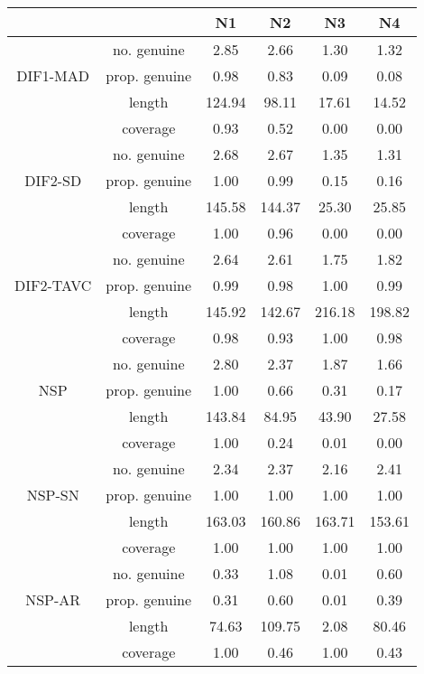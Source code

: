 \begin{tabular}{|c|c|c|c|c|c|}
  \hline
 &  & N1 & N2 & N3 & N4 \\ 
  \hline
 & no. genuine & 2.85 & 2.66 & 1.30 & 1.32 \\ 
  DIF1-MAD & prop. genuine & 0.98 & 0.83 & 0.09 & 0.08 \\ 
   & length & 124.94 & 98.11 & 17.61 & 14.52 \\ 
   & coverage & 0.93 & 0.52 & 0.00 & 0.00 \\ 
   & no. genuine & 2.68 & 2.67 & 1.35 & 1.31 \\ 
  DIF2-SD & prop. genuine & 1.00 & 0.99 & 0.15 & 0.16 \\ 
   & length & 145.58 & 144.37 & 25.30 & 25.85 \\ 
   & coverage & 1.00 & 0.96 & 0.00 & 0.00 \\ 
   & no. genuine & 2.64 & 2.61 & 1.75 & 1.82 \\ 
  DIF2-TAVC & prop. genuine & 0.99 & 0.98 & 1.00 & 0.99 \\ 
   & length & 145.92 & 142.67 & 216.18 & 198.82 \\ 
   & coverage & 0.98 & 0.93 & 1.00 & 0.98 \\ 
   & no. genuine & 2.80 & 2.37 & 1.87 & 1.66 \\ 
  NSP & prop. genuine & 1.00 & 0.66 & 0.31 & 0.17 \\ 
   & length & 143.84 & 84.95 & 43.90 & 27.58 \\ 
   & coverage & 1.00 & 0.24 & 0.01 & 0.00 \\ 
   & no. genuine & 2.34 & 2.37 & 2.16 & 2.41 \\ 
  NSP-SN & prop. genuine & 1.00 & 1.00 & 1.00 & 1.00 \\ 
   & length & 163.03 & 160.86 & 163.71 & 153.61 \\ 
   & coverage & 1.00 & 1.00 & 1.00 & 1.00 \\ 
   & no. genuine & 0.33 & 1.08 & 0.01 & 0.60 \\ 
  NSP-AR & prop. genuine & 0.31 & 0.60 & 0.01 & 0.39 \\ 
   & length & 74.63 & 109.75 & 2.08 & 80.46 \\ 
   & coverage & 1.00 & 0.46 & 1.00 & 0.43 \\ 
   \hline
\end{tabular}
